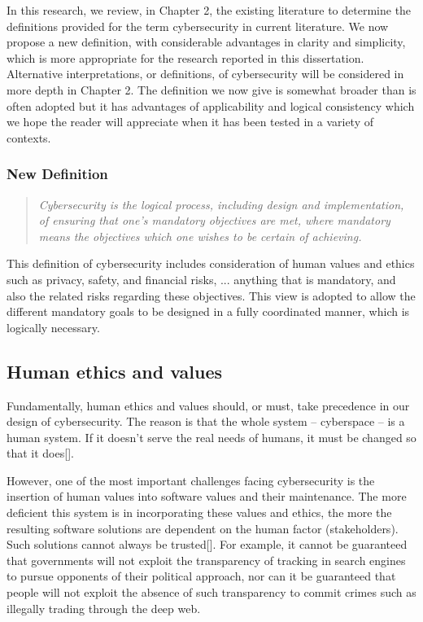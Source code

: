 In this research, we review, in Chapter 2,  the existing literature to determine the definitions provided for the term cybersecurity in current literature. We now  propose a new definition, with considerable advantages in clarity and simplicity, 
which is more appropriate for the research reported in this dissertation. Alternative interpretations, or definitions, of cybersecurity will be considered in more depth in Chapter 2.  The definition we now give is somewhat broader than is often adopted
but it has advantages of applicability and logical consistency which
we hope the reader will appreciate when it has been tested in a 
variety of contexts.

\subsubsection*{New Definition}
\begin{quote} \em Cybersecurity is the logical process, including design and implementation, of ensuring that one's mandatory objectives are met, where mandatory means the objectives which one wishes to be certain of achieving.\end{quote}

This definition of cybersecurity includes consideration of human values and ethics such as privacy, safety, and financial risks, ... anything that is mandatory, and also the related risks regarding these objectives. This view is adopted to allow the different mandatory goals
to be designed in a fully coordinated manner, which is logically necessary.

\subsection{Human ethics and values}
Fundamentally, human ethics and values should, or must, take precedence in our design of cybersecurity. The reason is that the whole system -- cyberspace -- is a human system. If it doesn't serve the real needs of humans, it must be changed so that it does[]. 

However, one of the most important challenges facing cybersecurity is the insertion of human values into software values and their maintenance.   
The more deficient this system is in incorporating these values and ethics, the more the resulting software solutions are dependent on the human factor (stakeholders). Such solutions cannot always be trusted[]. For example, it cannot be guaranteed that governments will not exploit the transparency of tracking in search engines to pursue opponents of their political approach, nor can it be guaranteed that people will not exploit the absence of such transparency to commit crimes  such as illegally trading through the deep web. 

